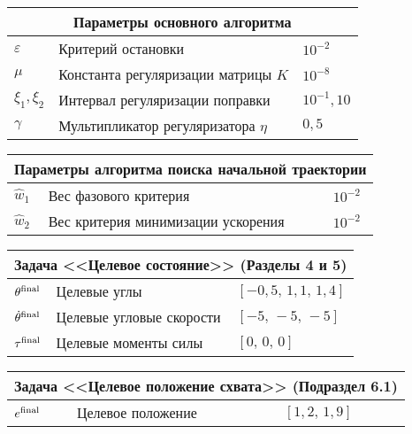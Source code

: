 \documentclass[../../doc.tex]{subfiles}
\begin{document}
    \begin{flushleft}\begin{tabular}{|p{2cm}|p{9.7cm}|p{4cm}|}
        \hline
        \multicolumn{3}{|c|}{Параметры основного алгоритма}
        \\\hline\hline
        $\varepsilon$ & Критерий остановки & $10^{-2}$
        \\ \hline
        $\mu$ & Константа регуляризации матрицы $K$ & $10^{-8}$
        \\ \hline
        $\xi_1, \xi_2$ & Интервал регуляризации поправки & $10^{-1}, 10$
        \\ \hline
        $\gamma$ & Мультипликатор регуляризатора $\eta$ & $0,\!5$
        \\ \hline
    \end{tabular}\end{flushleft}

    \begin{flushleft}\begin{tabular}{|p{2cm}|p{9.7cm}|p{4cm}|}
        \hline
        \multicolumn{3}{|c|}{Параметры алгоритма поиска начальной траектории}
        \\ \hline\hline
        $\hat w_1$ & Вес фазового критерия & $10^{-2}$
        \\ \hline
        $\hat w_2$ & Вес критерия минимизации ускорения & $10^{-2}$
        \\ \hline
    \end{tabular}\end{flushleft}


    \begin{flushleft}\begin{tabular}{|p{2cm}|p{9.7cm}|p{4cm}|}
        \hline
        \multicolumn{3}{|c|}{Задача <<Целевое состояние>> (Разделы 4 и 5)}
        \\ \hline\hline
        $\theta^{\textnormal{final}}$ & Целевые углы & $[-0,\!5,\, 1,\!1,\, 1,\!4]$
        \\ \hline
        $\dot \theta^{\textnormal{final}}$ & Целевые угловые скорости & $[ -5,\, -5,\, -5]$
        \\ \hline
        $\tau^{\textnormal{final}}$ & Целевые моменты силы & $[0,\,0,\,0]$
        \\ \hline
    \end{tabular}\end{flushleft}

    \begin{flushleft}\begin{tabular}{|p{2cm}|p{9.7cm}|p{4cm}|}
        \hline
        \multicolumn{3}{|c|}{Задача <<Целевое положение схвата>> (Подраздел 6.1)}
        \\ \hline\hline
        $e^{\textnormal{final}}$ & Целевое положение & $[1,\!2,\,1,\!9]$
        \\ \hline
    \end{tabular}\end{flushleft}
\end{document}
